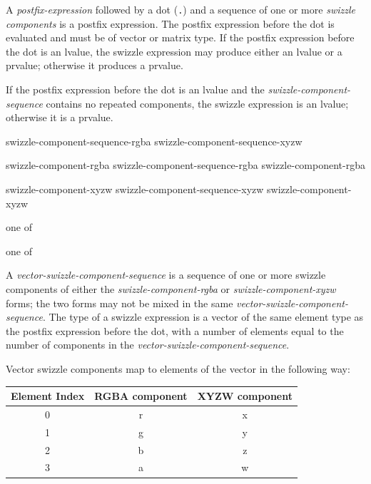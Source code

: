 \p A \textit{postfix-expression} followed by a dot (\texttt{.}) and a sequence
of one or more \textit{swizzle components} is a postfix expression. The
postfix expression before the dot is evaluated and must be of vector or matrix type.
If the postfix expression before the dot is an lvalue, the swizzle expression may
produce either an lvalue or a prvalue; otherwise it produces a prvalue.


\p If the postfix expression before the dot is
an lvalue and the \textit{swizzle-component-sequence} contains no repeated
components, the swizzle expression is an lvalue; otherwise it is a prvalue.


\begin{grammar}
  \br
  swizzle-component-sequence-rgba\br
  swizzle-component-sequence-xyzw\br

  \br
  swizzle-component-rgba\br
  swizzle-component-sequence-rgba swizzle-component-rgba\br

  \br
  swizzle-component-xyzw\br
  swizzle-component-sequence-xyzw swizzle-component-xyzw\br

   \textnormal{one of}\br
  \br

   \textnormal{one of}\br
\end{grammar}

\p A \textit{vector-swizzle-component-sequence} is a sequence of one or more swizzle
components of either the \textit{swizzle-component-rgba} or
\textit{swizzle-component-xyzw} forms; the two forms may not be mixed in the
same \textit{vector-swizzle-component-sequence}. The type of a swizzle expression is a
vector of the same element type as the postfix expression before the dot, with a
number of elements equal to the number of components in the \textit{vector-swizzle-component-sequence}.

\p Vector swizzle components map to elements of the vector in the following way:

\begin{center}
  \begin{tabular}{|| c | c | c ||}
    \hline
    Element Index & RGBA component & XYZW component \\
    \hline
    0 & r & x \\
    1 & g & y \\
    2 & b & z \\
    3 & a & w \\
    \hline
  \end{tabular}
\end{center}

